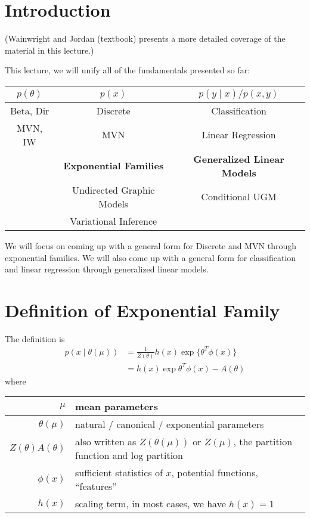 \documentclass{article}
\begin{document}

\section{Introduction}
(Wainwright and Jordan (textbook) presents a more detailed coverage of the material in this lecture.)

\medskip

\noindent This lecture, we will unify all of the fundamentals presented so far:
\begin{center}
\begin{tabular}{c | c | c }
    $p(\theta)$ & $p(x)$ & $p(y \mid x) / p(x, y)$  \\ \hline
    Beta, Dir & Discrete & Classification \\ \hline
    MVN, IW & MVN & Linear Regression \\ \hline
    & \textbf{Exponential Families} & \textbf{Generalized Linear Models} \\ \hline
     &Undirected Graphic Models & Conditional UGM \\ \hline
    & Variational Inference %
\end{tabular}
\end{center}
We will focus on coming up with a general form for Discrete and MVN through exponential families. We will also come up with a general form for classification and linear regression through generalized linear models. 

\section{Definition of Exponential Family}
The definition is
\begin{align*}
p(x \mid \theta(\mu)) &= \frac{1}{Z(\theta)} h(x) \exp\{\theta^T \phi(x)\} \\
&= h(x) \exp{\theta^T \phi(x) - A(\theta)}
\end{align*}
where
\medskip

\begin{tabular}{r | l}
    $\mu$ & mean parameters \\ \hline
    $\theta(\mu)$ & natural / canonical / exponential parameters \\ \hline
    $Z(\theta)A(\theta)$ & also written as $Z(\theta(\mu))$ or $Z(\mu)$, the partition function and log partition \\ \hline
    $\phi(x)$ & sufficient statistics of $x$, potential functions, ``features'' \\ \hline
    $h(x)$ & scaling term, in most cases, we have $h(x) = 1$
\end{tabular}
\medskip
\end{document}
